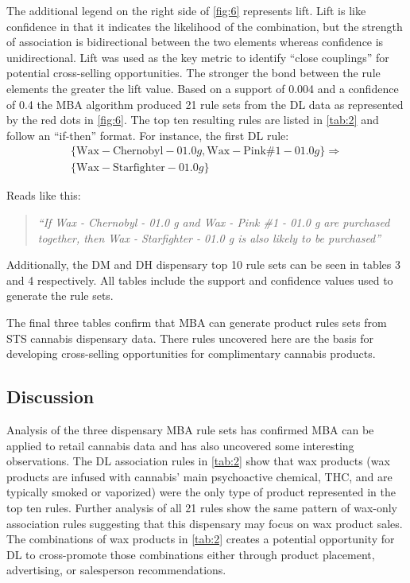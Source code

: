 \documentclass[../article.tex, 12pt]{subfiles}
\begin{document}
\begin{multicols*}{2}
\par
The additional legend on the right side of \autoref{fig:6} represents lift. Lift is like confidence in that it indicates the likelihood of the combination, but the strength of association is bidirectional between the two elements whereas confidence is unidirectional. Lift was used as the key metric to identify ``close couplings'' for potential cross-selling opportunities. The stronger the bond between the rule elements the greater the lift value. Based on a support of 0.004 and a confidence of 0.4 the MBA algorithm produced 21 rule sets from the DL data as represented by the red dots in \autoref{fig:6}. The top ten resulting rules are listed in \autoref{tab:2} and follow an ``if-then'' format. For instance, the first DL rule:
\begin{equation*}
\begin{split}
\{\text{Wax} - \text{Chernobyl} - 01.0 g, \text{Wax} - \text{Pink} \#1 - 01.0 g\} \Rightarrow \\
\{\text{Wax} - \text{Starfighter} - 01.0 g\}
\end{split}
\end{equation*}

\noindent Reads like this:

\begin{quote}
{\itshape ``If Wax - Chernobyl - 01.0 g and Wax - Pink \#1 - 01.0 g are purchased together, then Wax - Starfighter - 01.0 g is also likely to be purchased''}
\end{quote}

\par
Additionally, the DM and DH dispensary top 10 rule sets can be seen in tables 3 and 4 respectively. All tables include the support and confidence values used to generate the rule sets.

\par
The final three tables confirm that MBA can generate product rules sets from STS cannabis dispensary data. There rules uncovered here are the basis for developing cross-selling opportunities for complimentary cannabis products.

\subsection{Discussion}

Analysis of the three dispensary MBA rule sets has confirmed MBA can be applied to retail cannabis data and has also uncovered some interesting observations. The DL association rules in \autoref{tab:2} show that wax products (wax products are infused with cannabis' main psychoactive chemical, THC, and are typically smoked or vaporized) were the only type of product represented in the top ten rules. Further analysis of all 21 rules show the same pattern of wax-only association rules suggesting that this dispensary may focus on wax product sales. The combinations of wax products in \autoref{tab:2} creates a potential opportunity for DL to cross-promote those combinations either through product placement, advertising, or salesperson recommendations.


\end{multicols*}
\end{document}
